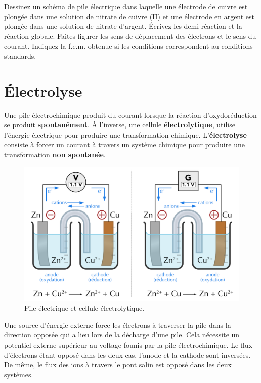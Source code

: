 \documentclass[
  11pt,
  french,
  a4paper,
  openany]{book}
\begin{document}
\begin{Exercise}

Dessinez un schéma de pile électrique dans laquelle une électrode de cuivre est plongée dans une solution de nitrate de cuivre (II) et une électrode en argent est plongée dans une solution de nitrate d'argent. Écrivez les demi-réaction et la réaction globale. Faites figurer les sens de déplacement des électrons et le sens du courant. Indiquez la f.e.m. obtenue si les conditions correspondent au conditions standards.



\end{Exercise}

\hypertarget{uxe9lectrolyse}{%
\section{Électrolyse}\label{uxe9lectrolyse}}

Une pile électrochimique produit du courant lorsque la réaction d'oxydoréduction se produit \textbf{spontanément}. À l'inverse, une cellule \textbf{électrolytique}, utilise l'énergie électrique pour produire une transformation chimique. L'\textbf{électrolyse} consiste à forcer un courant à travers un système chimique pour produire une transformation \textbf{non spontanée}.

\begin{figure}

{\centering \includegraphics[width=0.67\linewidth]{images/pile-recharge} 

}

\caption{Pile électrique et cellule électrolytique.}\label{fig:pile-recharge}
\end{figure}

Une source d'énergie externe force les électrons à traverser la pile dans la direction opposée qui a lieu lors de la décharge d'une pile. Cela nécessite un potentiel externe supérieur au voltage founis par la pile électrochimique. Le flux d'électrons étant opposé dans les deux cas, l'anode et la cathode sont inversées. De même, le flux des ions à travers le pont salin est opposé dans les deux systèmes.
\end{document}
